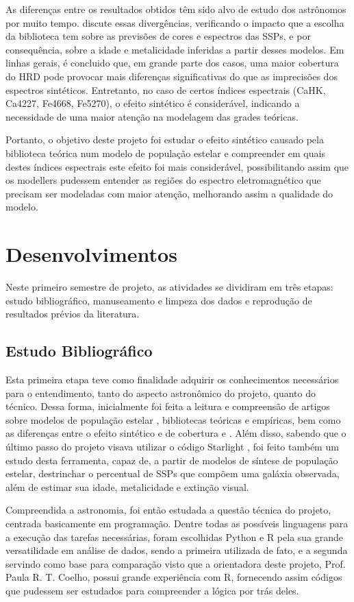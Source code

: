 \documentclass[12pt]{projeto}
\begin{document}
As diferenças entre os resultados obtidos têm sido alvo de estudo dos astrônomos por muito tempo. \cite{Paula2020} discute essas divergências, verificando o impacto que a escolha da biblioteca tem sobre as previsões de cores e espectros das SSPs, e por consequência, sobre a idade e metalicidade inferidas a partir desses modelos. Em linhas gerais, é concluido que, em grande parte dos casos, uma maior cobertura do HRD pode provocar mais diferenças significativas do que as imprecisões dos espectros sintéticos. Entretanto, no caso de certos índices espectrais (CaHK, Ca4227, Fe4668, Fe5270), o efeito sintético é considerável, indicando a necessidade de uma maior atenção na modelagem das grades teóricas.

Portanto, o objetivo deste projeto foi estudar o efeito sintético causado pela biblioteca teórica num modelo de população estelar e compreender em quais destes índices espectrais este efeito foi mais considerável, possibilitando assim que os modellers pudessem entender as regiões do espectro eletromagnético que precisam ser modeladas com maior atenção, melhorando assim a qualidade do modelo.

\section{Desenvolvimentos}
Neste primeiro semestre de projeto, as atividades se dividiram em três etapas: estudo bibliográfico, manuseamento e limpeza dos dados e reprodução de resultados prévios da literatura.

\subsection{Estudo Bibliográfico}
Esta primeira etapa teve como finalidade adquirir os conhecimentos necessários para o entendimento, tanto do aspecto astronômico do projeto, quanto do técnico. Dessa forma, inicialmente foi feita a leitura e compreensão de artigos sobre modelos de população estelar \cite{BC03}, bibliotecas teóricas e empíricas, bem como as diferenças entre o efeito sintético e de cobertura \cite{Paula2014} e \cite{Paula2020}. Além disso, sabendo que o último passo do projeto visava utilizar o código Starlight \cite{starlight}, foi feito também um estudo desta ferramenta,
capaz de, a partir de modelos de síntese de população estelar, destrinchar o percentual de SSPs que compõem uma galáxia observada, além de estimar sua idade, metalicidade e extinção visual.

Compreendida a astronomia, foi então estudada a questão técnica do projeto, centrada basicamente em programação. Dentre todas as possíveis linguagens para a execução das tarefas necessárias, foram escolhidas Python e R pela sua grande versatilidade em análise de dados, sendo a primeira utilizada de fato, e a segunda servindo como base para comparação visto que a orientadora deste projeto, Prof. Paula R. T. Coelho, possui grande experiência com R, fornecendo assim códigos que pudessem ser estudados para compreender a lógica por trás deles.
\end{document}
